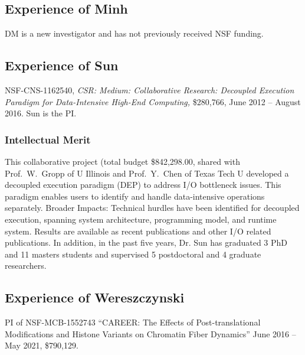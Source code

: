 \documentclass[11pt]{NSFamsart}
\begin{document}
\subsection{Experience of Minh}

DM is a new investigator and has not previously received NSF funding.  




\subsection{Experience of Sun}  NSF-CNS-1162540, \emph{CSR: Medium: Collaborative Research: Decoupled Execution Paradigm for Data-Intensive High-End Computing,} \$280,766, June 2012 -- August 2016. Sun is the PI.  
\subsubsection{Intellectual Merit} This collaborative project (total budget \$842,298.00, shared with Prof.~W.\ Gropp of U Illinois and Prof.~Y.~Chen of Texas Tech U developed a decoupled execution paradigm (DEP) to address I/O bottleneck issues. This paradigm enables users to identify and handle data-intensive operations separately. Broader Impacts: Technical hurdles have been identified for decoupled execution, spanning system architecture, programming model, and runtime system. Results are available as recent publications \cite{HeWS16, HeWS16a, HWSX17, HWLS17, HWSH17, KYES16, SuWa14, WaSu14, ZLKR16} and other I/O related publications. In addition, in the past five years, Dr. Sun has graduated 3 PhD and 11 masters students and supervised 5 postdoctoral and 4 graduate researchers.



\subsection{Experience of Wereszczynski}


PI of NSF-MCB-1552743   ``CAREER: The Effects of Post-translational Modifications and Histone Variants on Chromatin Fiber Dynamics'' June 2016 -- May 2021, \$790,129.
\end{document}
